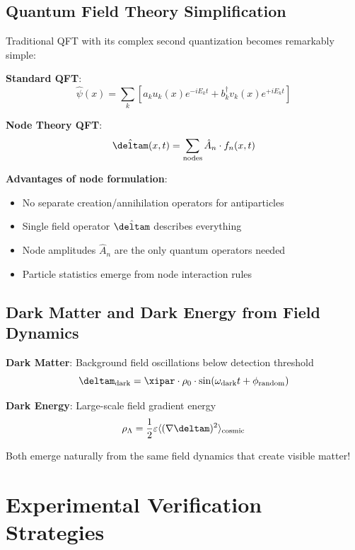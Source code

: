	\subsection{Quantum Field Theory Simplification}
	
	Traditional QFT with its complex second quantization becomes remarkably simple:
	
	\textbf{Standard QFT}:
	\begin{equation}
		\hat{\psi}(x) = \sum_k \left[ a_k u_k(x) e^{-iE_k t} + b_k^\dagger v_k(x) e^{+iE_k t} \right]
	\end{equation}
	
	\textbf{Node Theory QFT}:
	\begin{equation}
		\hat{\deltam}(x,t) = \sum_{\text{nodes}} \hat{A}_n \cdot f_n(x,t)
	\end{equation}
	
	\textbf{Advantages of node formulation}:
	\begin{itemize}
		\item No separate creation/annihilation operators for antiparticles
		\item Single field operator $\hat{\deltam}$ describes everything
		\item Node amplitudes $\hat{A}_n$ are the only quantum operators needed
		\item Particle statistics emerge from node interaction rules
	\end{itemize}
	
	\subsection{Dark Matter and Dark Energy from Field Dynamics}
	
	\textbf{Dark Matter}: Background field oscillations below detection threshold
	\begin{equation}
		\deltam_{\text{dark}} = \xipar \cdot \rho_0 \cdot \sin(\omega_{\text{dark}} t + \phi_{\text{random}})
	\end{equation}
	
	\textbf{Dark Energy}: Large-scale field gradient energy
	\begin{equation}
		\rho_{\Lambda} = \frac{1}{2} \varepsilon \langle (\nabla \deltam)^2 \rangle_{\text{cosmic}}
	\end{equation}
	
	Both emerge naturally from the same field dynamics that create visible matter!
	
	\section{Experimental Verification Strategies}
	
